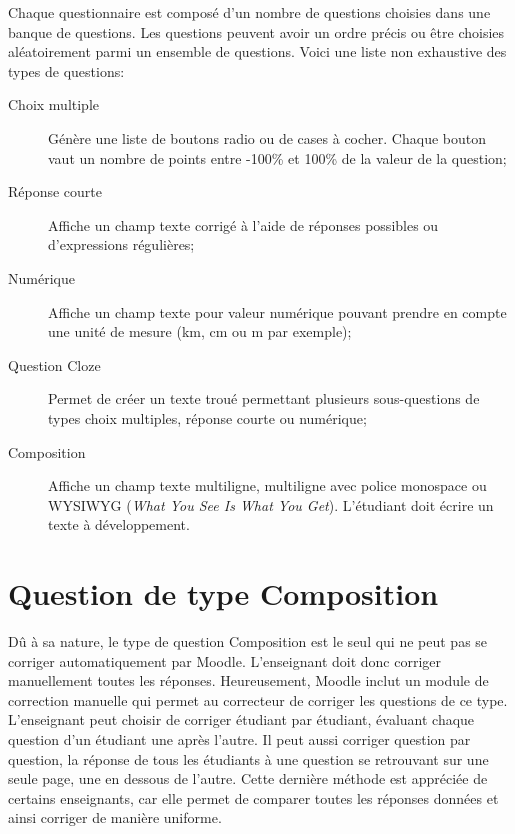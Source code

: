 Chaque questionnaire est composé d'un nombre de questions choisies dans une banque de questions.
Les questions peuvent avoir un ordre précis ou être choisies aléatoirement parmi un ensemble de questions.
Voici une liste non exhaustive des types de questions:

\begin{description}
  \item[Choix multiple]
  
  Génère une liste de boutons radio ou de cases à cocher.
  Chaque bouton vaut un nombre de points entre -100\% et 100\% de la valeur de la question;
  
  \item[Réponse courte]
  
  Affiche un champ texte corrigé à l'aide de réponses possibles ou d'expressions régulières;
  
  \item[Numérique]
  
  Affiche un champ texte pour valeur numérique pouvant prendre en compte une unité de mesure (km, cm ou m par exemple);
  
  \item[Question Cloze]
  
  Permet de créer un texte troué permettant plusieurs sous-questions de types choix multiples, réponse courte ou numérique;
  
  \item[Composition]
  
  Affiche un champ texte multiligne, multiligne avec police monospace ou WYSIWYG (\textit{What You See Is What You Get}).
  L'étudiant doit écrire un texte à développement.
\end{description}

\section{Question de type Composition}

Dû à sa nature, le type de question Composition est le seul qui ne peut pas se corriger automatiquement par Moodle.
L'enseignant doit donc corriger manuellement toutes les réponses.
Heureusement, Moodle inclut un module de correction manuelle qui permet au correcteur de corriger les questions de ce type.
L'enseignant peut choisir de corriger étudiant par étudiant, évaluant chaque question d'un étudiant une après l'autre.
Il peut aussi corriger question par question, la réponse de tous les étudiants à une question se retrouvant sur une seule page, une en dessous de l'autre.
Cette dernière méthode est appréciée de certains enseignants, car elle permet de comparer toutes les réponses données et ainsi corriger de manière uniforme.

